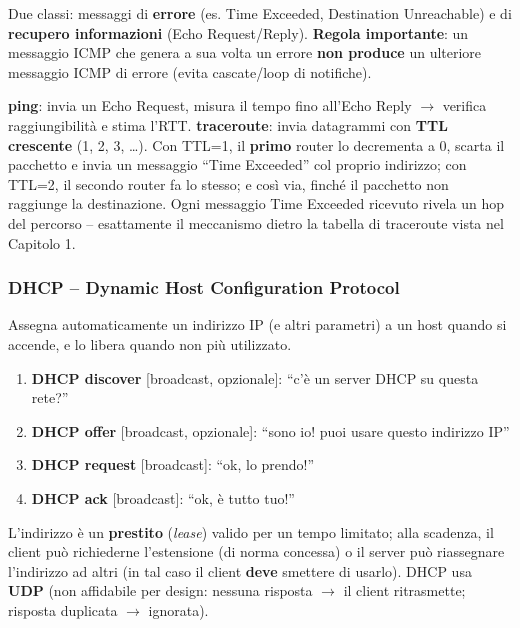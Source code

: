 \documentclass[12pt, a4paper]{article}
\begin{document}
Due classi: messaggi di \textbf{errore} (es. Time Exceeded, Destination Unreachable) e di \textbf{recupero informazioni} (Echo Request/Reply). \textbf{Regola importante}: un messaggio ICMP che genera a sua volta un errore \textbf{non produce} un ulteriore messaggio ICMP di errore (evita cascate/loop di notifiche).

\begin{tcolorbox}[colback=cyan!5, colframe=blue!40!black, title=\textbf{Come funzionano davvero ping e traceroute}]
\textbf{ping}: invia un Echo Request, misura il tempo fino all'Echo Reply $\to$ verifica raggiungibilità e stima l'RTT. \textbf{traceroute}: invia datagrammi con \textbf{TTL crescente} (1, 2, 3, \dots). Con TTL=1, il \textbf{primo} router lo decrementa a 0, scarta il pacchetto e invia un messaggio ``Time Exceeded'' col proprio indirizzo; con TTL=2, il secondo router fa lo stesso; e così via, finché il pacchetto non raggiunge la destinazione. Ogni messaggio Time Exceeded ricevuto rivela un hop del percorso -- esattamente il meccanismo dietro la tabella di traceroute vista nel Capitolo 1.
\end{tcolorbox}

\subsubsection{DHCP -- Dynamic Host Configuration Protocol}

Assegna automaticamente un indirizzo IP (e altri parametri) a un host quando si accende, e lo libera quando non più utilizzato.

\begin{tcolorbox}[colback=lightergray!10, colframe=tocsec, title=\textbf{I quattro messaggi (``DORA'')}]
\begin{enumerate}
    \item \textbf{DHCP discover} [broadcast, opzionale]: ``c'è un server DHCP su questa rete?''
    \item \textbf{DHCP offer} [broadcast, opzionale]: ``sono io! puoi usare questo indirizzo IP''
    \item \textbf{DHCP request} [broadcast]: ``ok, lo prendo!''
    \item \textbf{DHCP ack} [broadcast]: ``ok, è tutto tuo!''
\end{enumerate}
\end{tcolorbox}

L'indirizzo è un \textbf{prestito} (\textit{lease}) valido per un tempo limitato; alla scadenza, il client può richiederne l'estensione (di norma concessa) o il server può riassegnare l'indirizzo ad altri (in tal caso il client \textbf{deve} smettere di usarlo). DHCP usa \textbf{UDP} (non affidabile per design: nessuna risposta $\to$ il client ritrasmette; risposta duplicata $\to$ ignorata).
\end{document}
